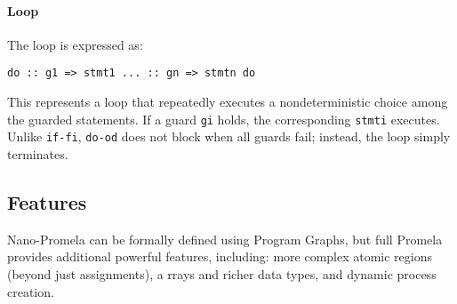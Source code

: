 \paragraph*{Loop}
The loop is expressed as: 
\begin{verbatim}
do :: g1 => stmt1 ... :: gn => stmtn do
\end{verbatim}
This represents a loop that repeatedly executes a nondeterministic choice among the guarded statements.
If a guard \texttt{gi} holds, the corresponding \texttt{stmti} executes.
Unlike \texttt{if-fi}, \texttt{do-od} does not block when all guards fail; instead, the loop simply terminates.

\subsection{Features}
Nano-Promela can be formally defined using Program Graphs, but full Promela provides additional powerful features, including: more complex atomic regions (beyond just assignments), a rrays and richer data types, and dynamic process creation.